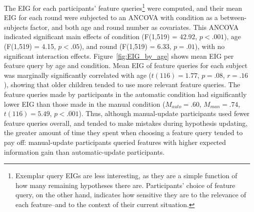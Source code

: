 \documentclass[10pt,letterpaper]{article}
\begin{document}
The EIG for each participants' feature queries\footnote{Exemplar query EIGs are less interesting, as they are a simple function of how many remaining hypotheses there are. Participants' choice of feature query, on the other hand, indicates how sensitive they are to the relevance of each feature--and to the context of their current situation.} were computed, and their mean EIG for each round were subjected to an ANCOVA with condition as a between-subjects factor, and both age and round number as covariates. This ANCOVA indicated significant main effects of condition (F(1,519) = 42.92, $p<.001$), age (F(1,519) = 4.15, $p<.05$), and round (F(1,519) = 6.33, $p = .01$), with no significant interaction effects. Figure~\ref{fig:EIG_by_age} shows mean EIG per feature query by age and condition. Mean EIG of feature queries for each subject was marginally significantly correlated with age ($t(116)=1.77$, $p=.08$, $r=.16$), showing that older children tended to use more relevant feature queries. The feature queries made by participants in the automatic condition had significantly lower EIG than those made in the manual condition ($M_{auto} = .60$, $M_{man} = .74$, $t(116) = 5.49$,  $p<.001$). Thus, although manual-update participants used fewer feature queries overall, and tended to make mistakes during hypothesis updating, the greater amount of time they spent when choosing a feature query tended to pay off: manual-update participants queried features with higher expected information gain than automatic-update participants. 


\end{document}
